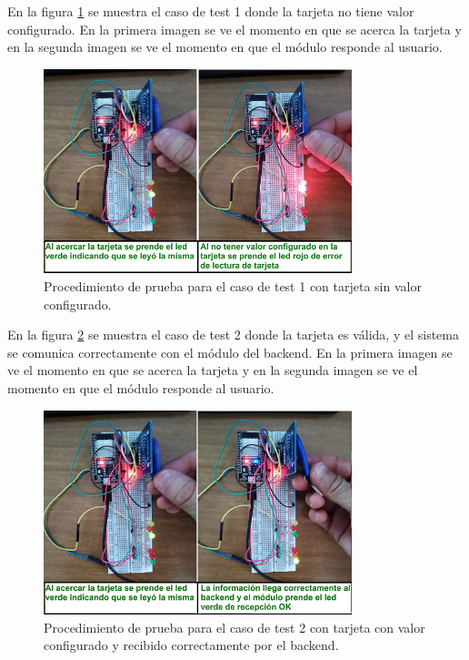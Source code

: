En la figura \ref{fig:TestTajetaSinCodigo} se muestra el caso de test 1 donde la tarjeta no tiene valor configurado. En la primera imagen se ve el momento en que se acerca la tarjeta y en la segunda imagen se ve el momento en que el módulo responde al usuario.

\begin{figure}[ht]
	\centering
	\includegraphics[width=0.8\textwidth]{./Figures/TestTajetaSinCodigo.png}
	\caption{Procedimiento de prueba para el caso de test 1 con tarjeta sin valor configurado.}
	\label{fig:TestTajetaSinCodigo}
\end{figure}


En la figura \ref{fig:TestTajetaCodigoLeida} se muestra el caso de test 2 donde la tarjeta es válida, y el sistema se comunica correctamente con el módulo del backend. En la primera imagen se ve el momento en que se acerca la tarjeta y en la segunda imagen se ve el momento en que el módulo responde al usuario.


\begin{figure}[ht]
	\centering
	\includegraphics[width=0.8\textwidth]{./Figures/TestTajetaCodigoLeida.png}
	\caption{Procedimiento de prueba para el caso de test 2 con tarjeta con valor configurado y recibido correctamente por el backend.}
	\label{fig:TestTajetaCodigoLeida}
\end{figure}


